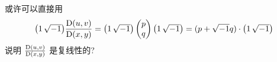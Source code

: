             \begin{remark}
                或许可以直接用
                \begin{equation*}
                    {\setlength{\arraycolsep}{0.8pt}\begin{pmatrix} 1 & \mi \end{pmatrix}}
                    \pD{u,v}{x,y} = 
                    {\setlength{\arraycolsep}{0.8pt}\begin{pmatrix} 1 & \mi \end{pmatrix}}
                    \begin{pmatrix} p \\ q \end{pmatrix}
                    {\setlength{\arraycolsep}{0.8pt}\begin{pmatrix} 1 & \mi \end{pmatrix}} = 
                    (p+\mi q)\cdot{\setlength{\arraycolsep}{0.8pt}\begin{pmatrix} 1 & \mi \end{pmatrix}}
                \end{equation*}
                说明 $\frac{{\rm D}(u,v)}{{\rm D}(x,y)}$ 是复线性的?
            \end{remark}
        
